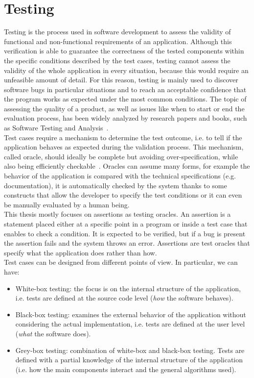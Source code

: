 \documentclass[11pt,a4paper,notitlepage]{article}
\begin{document}
\section{Testing}
Testing is the process used in software development to assess the validity of functional and non-functional requirements of an application. Although this verification is able to guarantee the correctness of the tested components within the specific conditions described by the test cases, testing cannot assess the validity of the whole application in every situation, because this would require an unfeasible amount of detail. For this reason, testing is mainly used to discover software bugs in particular situations and to reach an acceptable confidence that the program works as expected under the most common conditions. The topic of assessing the quality of a product, as well as issues like when to start or end the evaluation process, has been widely analyzed by research papers and books, such as Software Testing and Analysis~\cite{Young:2005:STA:1076948}.\bigskip \\
Test cases require a mechanism to determine the test outcome, i.e. to tell if the application behaves as expected during the validation process. This mechanism, called oracle, should ideally be complete but avoiding over-specification, while also being efficiently checkable~\cite{Baresi:Oracles}. Oracles can assume many forms, for example the behavior of the application is compared with the technical specifications (e.g. documentation), it is automatically checked by the system thanks to some constructs that allow the developer to specify the test conditions or it can even be manually evaluated by a human being.\medskip \\
This thesis mostly focuses on assertions as testing oracles. An assertion is a statement placed either at a specific point in a program or inside a test case that enables to check a condition. It is expected to be verified, but if a bug is present the assertion fails and the system throws an error. Assertions are test oracles that specify what the application does rather than how.\bigskip \\
Test cases can be designed from different points of view. In particular, we can have:
\begin{itemize}
	\item White-box testing: the focus is on the internal structure of the application, i.e. tests are defined at the source code level (\textit{how} the software behaves).
	\item Black-box testing: examines the external behavior of the application without considering the actual implementation, i.e. tests are defined at the user level (\textit{what} the software does).
	\item Grey-box testing: combination of white-box and black-box testing. Tests are defined with a partial knowledge of the internal structure of the application (i.e. how the main components interact and the general algorithms used).
\end{itemize}\bigskip
\end{document}
